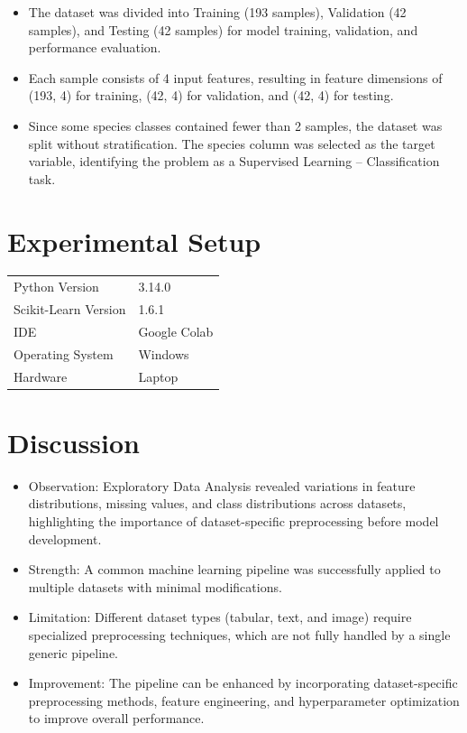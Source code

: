 \documentclass[12pt,a4paper]{article}
\begin{document}
\begin{itemize}
\begin{itemize}
\item The dataset was divided into Training (193 samples), Validation (42 samples), and Testing (42 samples) for model training, validation, and performance evaluation.
\item Each sample consists of 4 input features, resulting in feature dimensions of (193, 4) for training, (42, 4) for validation, and (42, 4) for testing.
\item Since some species classes contained fewer than 2 samples, the dataset was split without stratification. The species column was selected as the target variable, identifying the problem as a Supervised Learning – Classification task.
\end{itemize}
\end{itemize}

\section{Experimental Setup}
\begin{tabular}{ll}
\toprule
Python Version & 3.14.0\\
Scikit-Learn Version & 1.6.1\\
IDE & Google Colab\\
Operating System & Windows\\
Hardware & Laptop\\
\bottomrule
\end{tabular}

\section{Discussion}
\begin{itemize}
\item Observation:
Exploratory Data Analysis revealed variations in feature distributions, missing values, and class distributions across datasets, highlighting the importance of dataset-specific preprocessing before model development.
\item Strength:
A common machine learning pipeline was successfully applied to multiple datasets with minimal modifications.
\item Limitation:
Different dataset types (tabular, text, and image) require specialized preprocessing techniques, which are not fully handled by a single generic pipeline.
\item Improvement:
The pipeline can be enhanced by incorporating dataset-specific preprocessing methods, feature engineering, and hyperparameter optimization to improve overall performance.
\end{itemize}
\end{document}

